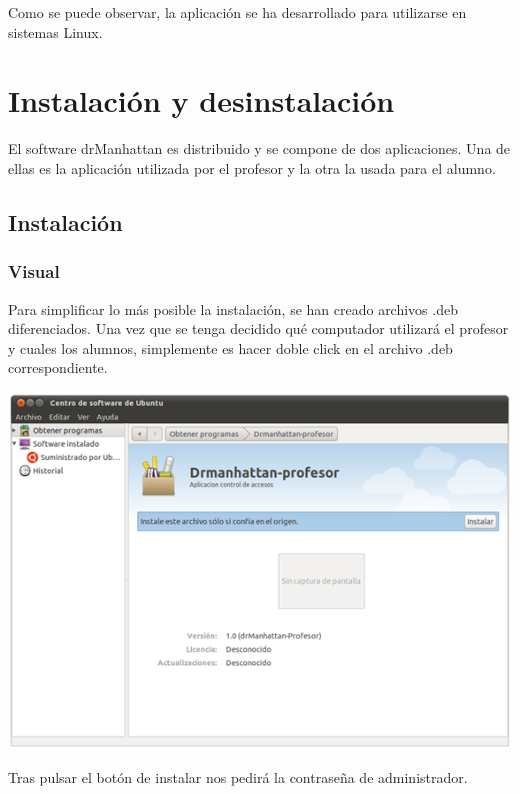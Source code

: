 \documentclass[11pt]{article}
\begin{document}
Como se puede observar, la aplicación se ha desarrollado para utilizarse en sistemas Linux.


\newpage

\section{Instalación y desinstalación}

El software drManhattan es distribuido y se compone de dos aplicaciones. Una de ellas es la aplicación utilizada por el profesor y la otra la usada para el alumno.

\subsection{Instalación}

\subsubsection{Visual}

Para simplificar lo más posible la instalación, se han creado archivos .deb diferenciados. Una vez que se tenga decidido qué computador utilizará el profesor y cuales los alumnos, simplemente es hacer doble click en el archivo .deb correspondiente.

\begin{center}

    \includegraphics[width=.90\linewidth]{imagenes/inst1}

\end{center}

Tras pulsar el botón de instalar nos pedirá la contraseña de administrador.
\end{document}
